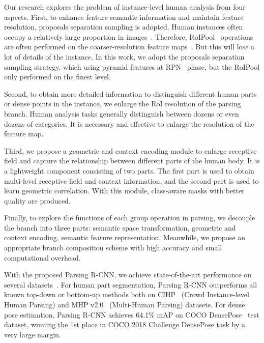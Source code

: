 \documentclass[10pt,twocolumn,letterpaper]{article}
\begin{document}
Our research explores the problem of instance-level human analysis from four aspects. First, to enhance feature semantic information and maintain feature resolution, proposals separation sampling is adopted. Human instances often occupy a relatively large proportion in images~\cite{Lin_eccv2014_coco}. Therefore, RoIPool~\cite{Girshick_iccv2015_fast-rcnn} operations are often performed on the coarser-resolution feature maps~\cite{Lin_cvpr2017_fpn}. But this will lose a lot of details of the instance. In this work, we adopt the proposals separation sampling strategy, which using pyramid features at RPN~\cite{Ren_nips2015_faster-rcnn} phase, but the RoIPool only performed on the finest level.

Second, to obtain more detailed information to distinguish different human parts or dense points in the instance, we enlarge the RoI resolution of the parsing branch. Human analysis tasks generally distinguish between dozens or even dozens of categories. It is necessary and effective to enlarge the resolution of the feature map.

Third, we propose a geometric and context encoding module to enlarge receptive field and capture the relationship between different parts of the human body. It is a lightweight component consisting of two parts. The first part is used to obtain multi-level receptive field and context information, and the second part is used to learn geometric correlation. With this module, class-aware masks with better quality are produced.

Finally,  to explore the functions of each group operation in parsing, we decouple the branch into three parts: semantic space transformation, geometric and context encoding, semantic feature representation. Meanwhile, we propose an appropriate branch composition scheme with high accuracy and small computational overhead.

With the proposed Parsing R-CNN, we achieve state-of-the-art performance on several datasets~\cite{Zhao_mm2018_mhpv2, Gong_eccv2018_pgn}. For human part segmentation, Parsing R-CNN outperforms all known top-down or bottom-up methods both on CIHP~\cite{Gong_eccv2018_pgn} (Crowd Instance-level Human Parsing) and MHP v2.0~\cite{Zhao_mm2018_mhpv2} (Multi-Human Parsing) datasets. For dense pose estimation, Parsing R-CNN achieves 64.1\% mAP on COCO DensePose~\cite{Guler_cvpr2018_densepose} test dataset, winning the 1st place in COCO 2018 Challenge DensePose task by a very large margin.
\end{document}
